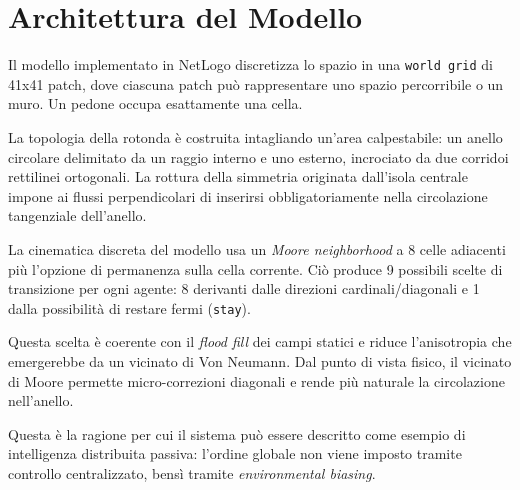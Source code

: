 \section{Architettura del Modello}
Il modello implementato in NetLogo discretizza lo spazio in una \texttt{world grid} di 41x41 patch, dove ciascuna patch può rappresentare uno spazio percorribile o un muro. Un pedone occupa esattamente una cella.

La topologia della rotonda è costruita intagliando un'area calpestabile: un anello circolare delimitato da un raggio interno e uno esterno, incrociato da due corridoi rettilinei ortogonali. La rottura della simmetria originata dall'isola centrale impone ai flussi perpendicolari di inserirsi obbligatoriamente nella circolazione tangenziale dell'anello.

La cinematica discreta del modello usa un \textit{Moore neighborhood} a 8 celle adiacenti più l'opzione di permanenza sulla cella corrente. Ciò produce 9 possibili scelte di transizione per ogni agente: 8 derivanti dalle direzioni cardinali/diagonali e 1 dalla possibilità di restare fermi (\texttt{stay}).

Questa scelta è coerente con il \textit{flood fill} dei campi statici e riduce l'anisotropia che emergerebbe da un vicinato di Von Neumann. Dal punto di vista fisico, il vicinato di Moore permette micro-correzioni diagonali e rende più naturale la circolazione nell'anello.

Questa è la ragione per cui il sistema può essere descritto come esempio di intelligenza distribuita passiva: l'ordine globale non viene imposto tramite controllo centralizzato, bensì tramite \textit{environmental biasing}.
